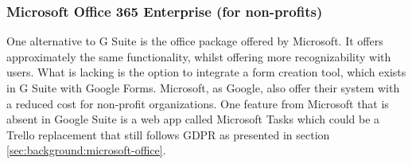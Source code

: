 \subsubsection{Microsoft Office 365 Enterprise (for non-profits)}
One alternative to G Suite is the office package offered by Microsoft. It offers approximately the same functionality, whilst offering more recognizability with users. What is lacking is the option to integrate a form creation tool, which exists in G Suite with Google Forms. Microsoft, as Google, also offer their system with a reduced cost for non-profit organizations. One feature from Microsoft that is absent in Google Suite is a web app called Microsoft Tasks which could be a Trello replacement that still follows GDPR as presented in section \ref{sec:background:microsoft-office}. 



